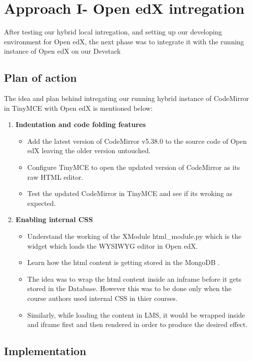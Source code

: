 \chapter{Approach I- Open edX intregation}
After testing our hybrid local intregation, and setting up our developing environment for Open edX,
the next phase was to integrate it with the running instance of Open edX on our Devstack
\section{Plan of action}
The idea and plan behind intregating our running hybrid instance of CodeMirror in TinyMCE with
Open edX is mentioned below:
\begin{enumerate}
\item\textbf{Indentation and code folding features}
\begin{itemize}
\item Add the latest version of CodeMirror v5.38.0 to the source code of Open edX
leaving the older version untouched.
\item Configure TinyMCE to open the updated version of CodeMirror as its raw HTML
editor.
\item Test the updated CodeMirror in TinyMCE and see if its wroking as expected.
\end{itemize}
\item\textbf{Enabling internal CSS}
\begin{itemize}
\item Understand the working of the XModule html\_module.py which is the widget
which loads the WYSIWYG editor in Open edX.
\item Learn how the html content is getting stored in the MongoDB .
\item The idea was to wrap the html content inside an inframe before it gets stored in the
Database. However this was to be done only when the course authors used internal
CSS in thier courses.
\item Similarly, while loading the content in LMS, it would be wrapped inside and iframe
first and then rendered in order to produce the desired effect.
\end{itemize}
\end{enumerate}

\section{Implementation}

